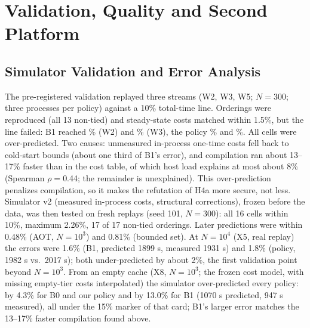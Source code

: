 \documentclass[conference]{IEEEtran}
\newcommand{\tn}[1]{#1}%
\begin{document}
\section{Validation, Quality and Second Platform}\label{sec:trust}
\subsection{Simulator Validation and Error Analysis}\label{sec:valid}
The pre-registered validation replayed three streams (W2, W3, W5; $N{=}300$; three processes per policy) against a 10\% total-time line. Orderings were reproduced (\tn{all 13 non-tied}) and steady-state costs matched within \tn{1.5\%}, but the line failed: B1 reached \NRealMaxErrPct\% (W2) and \NRealErrBOneWthreePct\% (W3), the policy \NRealErrOursWtwoPct\% and \NRealErrOursWthreePct\%. All \NRealJudged{} cells were over-predicted. Two causes: unmeasured in-process one-time costs fell back to cold-start bounds (about one third of B1's error), and compilation ran about \tn{13--17\%} faster than in the cost table, of which host load explains at most about \tn{8\%} (Spearman $\rho{=}$\tn{0.44}; the remainder is unexplained). This over-prediction penalizes compilation, so it makes the refutation of H4a more secure, not less. Simulator v2 (measured in-process costs, structural corrections), frozen before the data, was then tested on fresh replays (seed 101, $N{=}300$): \tn{all 16 cells within 10\%, maximum 2.26\%, 17 of 17 non-tied orderings}. Later predictions were within \tn{0.48\%} (AOT, $N{=}10^3$) and \tn{0.81\%} (bounded set). At $N{=}10^4$ (X5, real replay) the errors were \tn{1.6\%} (B1, predicted \tn{1899 s}, measured \tn{1931 s}) and \tn{1.8\%} (policy, \tn{1982 s} vs.\ \tn{2017 s}); both under-predicted by about \tn{2\%}, the first validation point beyond $N{=}10^3$. From an empty cache (X8, $N{=}10^3$; the frozen cost model, with missing empty-tier costs interpolated) the simulator over-predicted every policy: by \tn{4.3\%} for B0 and our policy and by \tn{13.0\%} for B1 (\tn{1070 s} predicted, \tn{947 s} measured), all under the 15\% marker of that card; B1's larger error matches the \tn{13--17\%} faster compilation found above.
\end{document}
